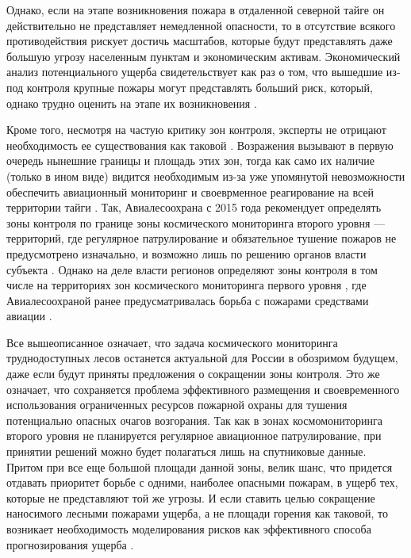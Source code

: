\documentclass[a4paper,article,14pt]{extarticle}
\begin{document}
Однако, если на этапе возникновения пожара в отдаленной северной тайге он действительно не представляет немедленной опасности, то в отсутствие всякого противодействия рискует достичь масштабов, которые будут представлять даже большую угрозу населенным пунктам и экономическим активам. Экономический анализ потенциального ущерба свидетельствует как раз о том, что вышедшие из-под контроля крупные пожары могут представлять больший риск, который, однако трудно оценить на этапе их возникновения \cite{MnimoyRealnoyEkonomicheskoy2019}.

Кроме того, несмотря на частую критику зон контроля, эксперты не отрицают необходимость ее существования как таковой \cite{MnimoyRealnoyEkonomicheskoy2019, GreenpeacePodgotovilPredlozheniya}. Возражения вызывают в первую очередь нынешние границы и площадь этих зон, тогда как само их наличие (только в ином виде) видится необходимым из-за уже упомянутой невозможности обеспечить авиационный мониторинг и своеврменное реагирование на всей территории тайги \cite{PonomarevChapter10System2015, MnimoyRealnoyEkonomicheskoy2019}. Так, Авиалесоохрана с 2015 года рекомендует определять зоны контроля по границе зоны космического мониторинга второго уровня — территорий, где регулярное патрулирование и обязательное тушение пожаров не предусмотрено изначально, и возможно лишь по решению органов власти субъекта \cite{MetodicheskieRekomendaciiPo2010}. Однако на деле власти регионов определяют зоны контроля в том числе на территориях зон космического мониторинга первого уровня \cite{KosmicheskiyMonitoringLesnyh2019}, где Авиалесоохраной ранее предусматривалась борьба с пожарами средствами авиации \cite{MetodicheskieRekomendaciiPo2010}.

Все вышеописанное означает, что задача космического мониторинга труднодоступных лесов останется актуальной для России в обозримом будущем, даже если будут приняты предложения о сокращении зоны контроля. Это же означает, что сохраняется проблема эффективного размещения и своевременного использования ограниченных ресурсов пожарной охраны для тушения потенциально опасных очагов возгорания. Так как в зонах космомониторинга второго уровня не планируется регулярное авиационное патрулирование, при принятии решений можно будет полагаться лишь на спутниковые данные. Притом при все еще большой площади данной зоны, велик шанс, что придется отдавать приоритет борьбе с одними, наиболее опасными пожарам, в ущерб тех, которые не представляют той же угрозы. И если ставить целью сокращение наносимого лесными пожарами ущерба, а не площади горения как таковой, то возникает необходимость моделирования рисков как эффективного способа прогнозирования ущерба \cite{OliveiraWildfireRiskModeling2021, PonomarevChapter10System2015}.
\end{document}
